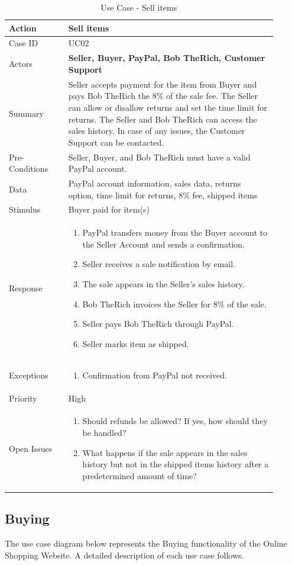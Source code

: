 \documentclass[11pt]{article}
\newcounter{use case ID}
\newcommand\tabularhead[1]{
    \begin{table}[ht]
        \addtocounter{use case ID}{1}
        \caption{Use Case \arabic{use case ID} - #1}
        \vspace{0.2cm}
        \begin{tabular}{|p{0.2\linewidth}|p{0.70\linewidth}|}
            \hline
            \textbf{Action} & \textbf{#1} \\
            \hline}
\newcommand\addrow[2]{#1 & #2\\ \hline}
\newcommand\addmulrow[2]{ \begin{minipage}[t][][t]{2.5cm}#1\end{minipage}
                &\begin{minipage}[t][][t]{11cm}
                    \begin{enumerate}[itemsep=-1ex] #2   \end{enumerate}
                \end{minipage}\vfill\\ \hline}
\newenvironment{usecase}{\tabularhead}
        {\hline\end{tabular}\end{table}}
\begin{document}
\begin{usecase}{Sell items}
    \addrow{Case ID}{UC02}
    \addrow{Actors}{\textbf{Seller, Buyer, PayPal, Bob TheRich, Customer Support}}
    \addrow{Summary}{Seller accepts \index{payment}payment for the item from \index{buyer}Buyer and pays Bob TheRich the 8\% of the sale fee. The \index{seller}Seller can allow or disallow returns and set the time limit for returns. The Seller and Bob TheRich can access the sales history. In case of any issues, the Customer Support can be contacted.}
    \addrow{Pre-Conditions}{Seller, \index{buyer}Buyer, and Bob TheRich must have a valid \index{PayPal}PayPal account. }
    \addrow{\index{data}Data}{PayPal account \index{information}information, sales \index{data}data, returns option, time limit for returns, 8\% fee, shipped items}
    \addrow{Stimulus}{Buyer paid for item(s)}
    \addmulrow{Response}{
            \item \index{PayPal}PayPal transfers money from the \index{buyer}Buyer account to the Seller Account and sends a confirmation.
            \item \index{seller}Seller receives a sale notification by email.
            \item The sale appears in the Seller’s sales history.
            \item Bob TheRich invoices the Seller for 8\% of the sale.
            \item Seller pays Bob TheRich through PayPal.
            \item Seller marks item as shipped.
    }

    \addmulrow{Exceptions}{
            \item Confirmation from \index{PayPal}PayPal not received.
    }
    \addrow{Priority}{High}
    \addmulrow{Open Issues}{
            \item Should refunds be allowed? If yes, how should they be handled?
            \item What happens if the sale appears in the sales history but not in the shipped items history after a predetermined amount of time?
    }
\end{usecase}
\clearpage

\subsection{Buying}

The use case diagram below represents the Buying functionality of the Online Shopping Website. A detailed description of each use case follows.
\end{document}
